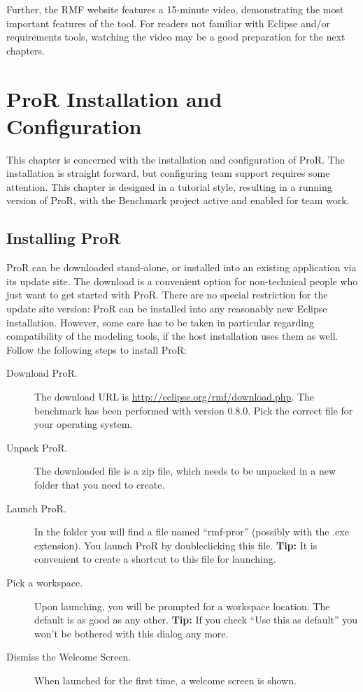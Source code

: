 \documentclass{template/openetcs_report}
\begin{document}
Further, the RMF website \cite{RMF} features a 15-minute video, demonstrating the most important features of the tool.  For readers not familiar with Eclipse and/or requirements tools, watching the video may be a good preparation for the next chapters.

\chapter{ProR Installation and Configuration}

This chapter is concerned with the installation and configuration of ProR.  The installation is straight forward, but configuring team support requires some attention.  This chapter is designed in a tutorial style, resulting in a running version of ProR, with the Benchmark project active and enabled for team work.

\section{Installing ProR}

ProR can be downloaded stand-alone, or installed into an existing application via its update site.  The download is a convenient option for non-technical people who just want to get started with ProR.  There are no special restriction for the update site version: ProR can be installed into any reasonably new Eclipse installation.  However, some care has to be taken in particular regarding compatibility of the modeling tools, if the host installation uses them as well.  Follow the following steps to install ProR:

\begin{description}

\item[Download ProR.]  The download URL is \url{http://eclipse.org/rmf/download.php}.  The benchmark has been performed with version 0.8.0.  Pick the correct file for your operating system.

\item[Unpack ProR.]  The downloaded file is a zip file, which needs to be unpacked in a new folder that you need to create.

\item[Launch ProR.] In the folder you will find a file named ``rmf-pror'' (possibly with the .exe extension).  You launch ProR by doubleclicking this file. \textbf{Tip:} It is convenient to create a shortcut to this file for launching.

\item[Pick a workspace.] Upon launching, you will be prompted for a workspace location.  The default is as good as any other. \textbf{Tip:} If you check ``Use this as default'' you won't be bothered with this dialog any more.

\item[Dismiss the Welcome Screen.] When launched for the first time, a welcome screen is shown.

\end{description}
\end{document}
